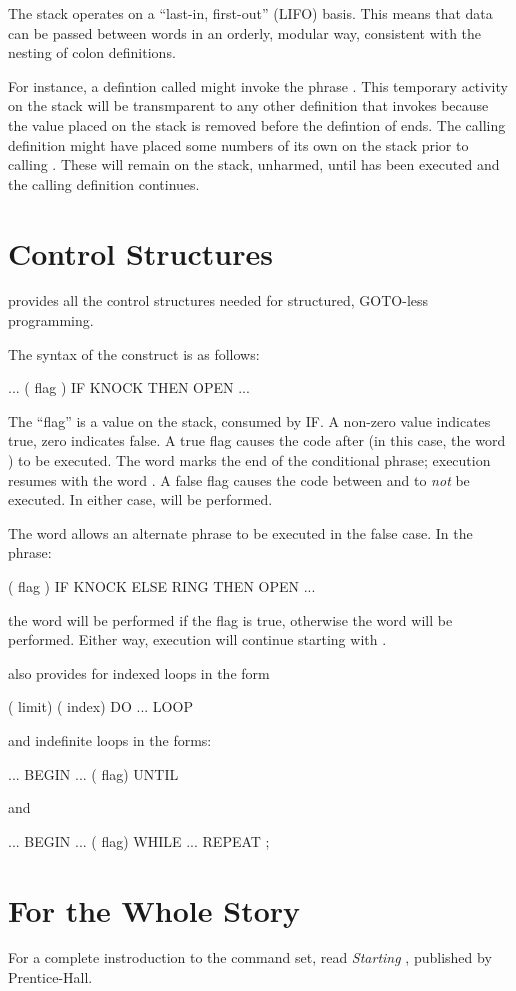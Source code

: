 The stack operates on a ``last-in, first-out'' (LIFO) basis.  This means
that data can be passed between words in an orderly, modular way, consistent
with the nesting of colon definitions.

For instance, a defintion called  might invoke the phrase
.  This temporary activity on the stack will be
transmparent to any other definition that invokes  because
the value placed on the stack is removed before the defintion of
 ends.  The calling definition might have placed some
numbers of its own on the stack prior to calling .  These
will remain on the stack, unharmed, until  has been
executed and the calling definition continues.

\section{Control Structures}
\Forth{} provides all the control structures%
%
needed for structured, GOTO-less programming.

The syntax of the  construct is as follows:
\begin{Code}
... ( flag ) IF  KNOCK  THEN  OPEN ...
\end{Code}
The ``flag'' is a value on the stack, consumed by IF. A non-zero value
indicates true, zero indicates false.  A true flag causes the code after  (in
this case, the word ) to be executed.  The word  marks the
end of the conditional phrase; execution resumes with the word .  A
false flag causes the code between  and  to {\em not} be executed.  In
either case,  will be performed.

The word  allows an alternate phrase to be executed
in the false case. In the phrase:
\begin{Code}
( flag ) IF KNOCK  ELSE  RING  THEN  OPEN ...
\end{Code}
the word  will be performed if the flag is true, otherwise the word
 will be performed.  Either way, execution will continue starting
with .

\Forth{} also provides for indexed loops in the form
\begin{Code}
( limit) ( index) DO ... LOOP
\end{Code}
and indefinite loops in the forms:
\begin{Code}
... BEGIN  ...  ( flag) UNTIL
\end{Code}
and
\begin{Code}
... BEGIN  ...  ( flag) WHILE ... REPEAT ;
\end{Code}
\section{For the Whole Story}
For a complete instroduction to the \Forth{} command set, read {\em Starting
\Forth{}}, published by Prentice-Hall.%
%
